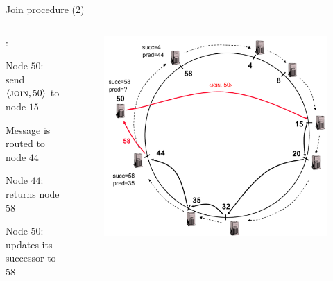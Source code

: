 \begin{frame}{Join procedure (2)}

\begin{columns}
\begin{column}{0.4\textwidth}
:
\BI
\item Node $50$: send $\langle \textsc{join}, 50 \rangle$ to node $15$ 
\item Message is routed to node $44$
\item Node $44$: returns node $58$ 
\item Node $50$: updates its successor to $58$
\EI

\end{column}
\begin{column}{0.6\textwidth}
\begin{figure}
\includegraphics[width=1.0\textwidth]{figs/10/chord-example4}
\end{figure}
\end{column}
\end{columns}

\end{frame}

